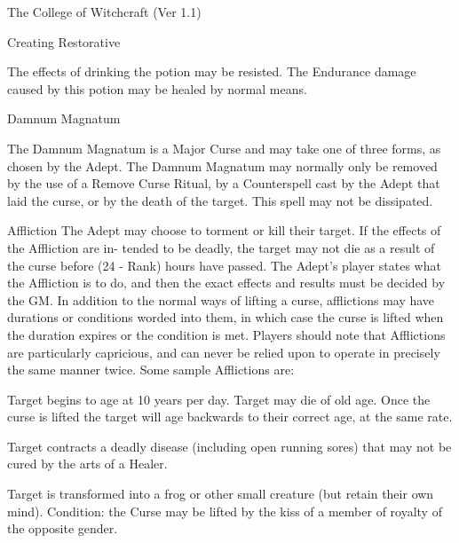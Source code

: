 \begin{Chapter}{The College of Witchcraft (Ver 1.1)}
\begin{spell}[S-9]{Creating Restorative}
\begin{effects}
The effects of drinking the potion may be resisted.  The Endurance
damage caused by this potion may be healed by normal means.

\end{effects}
\end{spell}

\begin{spell}[S-10]{Damnum Magnatum}

\begin{effects}
The Damnum Magnatum is a Major Curse and may take one of three forms,
as chosen by the Adept.  The Damnum Magnatum may normally only be
removed by the use of a Remove Curse Ritual, by a Counterspell cast by
the Adept that laid the curse, or by the death of the target.  This
spell may not be dissipated.

\begin{Description}
\item[Affliction] The Adept may choose to torment or kill their
  target.  If the effects of the Affliction are in- tended to be
  deadly, the target may not die as a result of the curse before (24 -
  Rank) hours have passed.  The Adept’s player states what the
  Affliction is to do, and then the exact effects and results must be
  decided by the GM.  In addition to the normal ways of lifting a
  curse, afflictions may have durations or conditions worded into
  them, in which case the curse is lifted when the duration expires or
  the condition is met.  Players should note that Afflictions are
  particularly capricious, and can never be relied upon to operate in
  precisely the same manner twice. Some sample Afflictions are:
\begin{Itemize}
\item Target begins to age at 10 years per day. Target may die of old
  age.  Once the curse is lifted the target will age backwards to
  their correct age, at the same rate.

\item Target contracts a deadly disease (including open running sores)
  that may not be cured by the arts of a Healer.

\item Target is transformed into a frog or other small creature (but
  retain their own mind). Condition: the Curse may be lifted by the
  kiss of a member of royalty of the opposite gender.


\end{Itemize}
\end{Description}
\end{effects}
\end{spell}
\end{Chapter}
